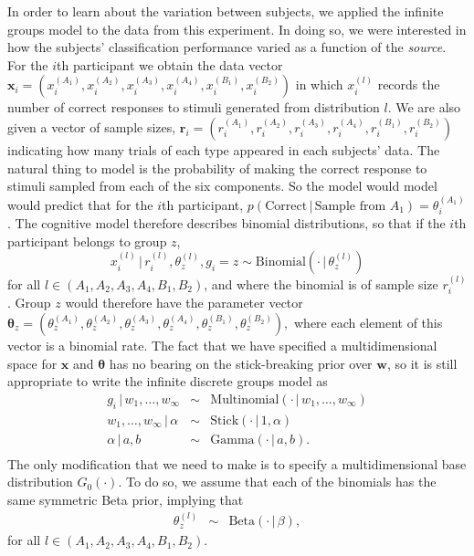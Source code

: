 \documentclass[authoryear]{elsarticle}
\newcommand{\condon}{\,|\,}
\newcommand{\vctr}[1]{\bm{#1}}
\begin{document}
In order to learn about the variation between subjects, we applied the
infinite groups model to the data from this experiment. In doing so, we
were interested in how the subjects' classification performance varied
as a function of the \emph{source}. For the $i$th participant we obtain
the data vector
$\vctr{x}_i=\left(x_i^{(A_1)}, x_i^{(A_2)}, x_i^{(A_3)}, x_i^{(A_4)},
x_i^{(B_1)}, x_i^{(B_2)} \right)$
in which $x_i^{(l)}$ records the number of correct responses to stimuli
generated from distribution $l$. We are also given a vector of sample
sizes,
$\vctr{r}_i=\left(r_i^{(A_1)}, r_i^{(A_2)}, r_i^{(A_3)}, r_i^{(A_4)},
r_i^{(B_1)}, r_i^{(B_2)} \right)$
indicating how many trials of each type appeared in each subjects' data.
The natural thing to model is the probability of making the correct response to
stimuli sampled from each of the six components.  So the model would
model would predict that for the $i$th participant, $p(\mbox{Correct}
\condon \mbox{Sample from } A_1) = \theta_i^{(A_1)}$. The cognitive
model therefore describes binomial distributions, so that if the $i$th
participant belongs to group $z$,
\[
       x_i^{(l)} \condon r_i^{(l)}, \theta_z^{(l)}, g_i=z  \sim
        \mbox{Binomial}\left(\cdot \condon \theta_z^{(l)}\right)
\]
for all $l \in (A_1, A_2, A_3, A_4, B_1, B_2)$, and where the binomial
is of sample size $r_i^{(l)}$. Group $z$ would therefore
have the parameter vector
$\vctr{\theta}_z=\left(\theta_z^{(A_1)},
\theta_z^{(A_2)}, \theta_z^{(A_3)}, \theta_z^{(A_4)}, \theta_z^{(B_1)},
\theta_z^{(B_2)}\right), $
where each element of this vector is a binomial rate. The fact that we have specified
a multidimensional space for $\vctr{x}$ and $\vctr{\theta}$ has no bearing on the
stick-breaking prior over $\vctr{w}$, so it is still appropriate to write the infinite
discrete groups model as
\[
        \begin{array}{rcl}
        g_i \condon w_1, \ldots, w_\infty & \sim &
        \mbox{Multinomial}(\cdot \condon w_1, \ldots, w_\infty) \\
        w_1, \ldots, w_\infty \condon \alpha & \sim &
        \mbox{Stick}(\cdot \condon 1,\alpha) \\
        \alpha \condon a, b & \sim & \mbox{Gamma}(\cdot \condon a,b).\\
        \end{array}
\]
The only modification that we need to make is to specify a multidimensional base
distribution $G_0(\cdot)$. To do so, we assume that each of the binomials has the same
symmetric Beta prior, implying that
\[
        \begin{array}{rcl}
        \theta_{z}^{(l)} & \sim & \mbox{Beta}(\cdot \condon \beta),
        \end{array}
\]
for all $l \in (A_1, A_2, A_3, A_4, B_1, B_2)$.
\end{document}
